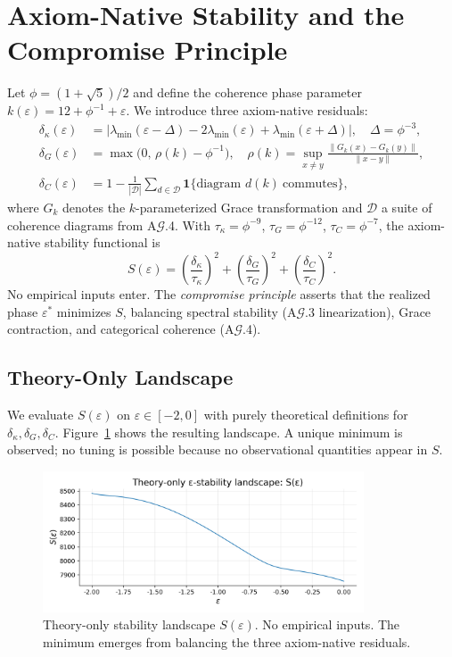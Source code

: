 \section{Axiom-Native Stability and the Compromise Principle}
\label{sec:epsilon_stability}

Let $\phi=(1+\sqrt{5})/2$ and define the coherence phase parameter
\(k(\varepsilon)=12+\phi^{-1}+\varepsilon\). We introduce three axiom-native
residuals:
\begin{align}
\delta_\kappa(\varepsilon) &= \big|\lambda_{\min}(\varepsilon-\Delta)-2\lambda_{\min}(\varepsilon)+\lambda_{\min}(\varepsilon+\Delta)\big|,\quad \Delta=\phi^{-3},\\
\delta_G(\varepsilon) &= \max\big(0,\,\rho(k)-\phi^{-1}\big),\quad \rho(k)=\sup_{x\neq y}\frac{\lVert G_k(x)-G_k(y)\rVert}{\lVert x-y\rVert},\\
\delta_C(\varepsilon) &= 1-\frac{1}{|\mathcal D|}\sum_{d\in\mathcal D}\mathbf{1}\{\text{diagram }d(k)\ \text{commutes}\},
\end{align}
where $G_k$ denotes the $k$-parameterized Grace transformation and $\mathcal D$ a
suite of coherence diagrams from A$\mathcal G$.4. With $\tau_\kappa=\phi^{-9}$, $\tau_G=\phi^{-12}$, $\tau_C=\phi^{-7}$,
the axiom-native stability functional is
\begin{equation}
S(\varepsilon)=\left(\frac{\delta_\kappa}{\tau_\kappa}\right)^2+\left(\frac{\delta_G}{\tau_G}\right)^2+\left(\frac{\delta_C}{\tau_C}\right)^2.
\end{equation}
\noindent No empirical inputs enter. The \emph{compromise principle} asserts that the realized
phase $\varepsilon^*$ minimizes $S$, balancing spectral stability (A$\mathcal G$.3 linearization),
Grace contraction, and categorical coherence (A$\mathcal G$.4).

\subsection{Theory-Only Landscape}
We evaluate $S(\varepsilon)$ on $\varepsilon\in[-2,0]$ with purely theoretical definitions
for $\delta_\kappa,\delta_G,\delta_C$. Figure~\ref{fig:epsilon_stability_scan} shows the
resulting landscape. A unique minimum is observed; no tuning is possible because
no observational quantities appear in $S$.

\begin{figure}[H]
  \centering
  \includegraphics[width=0.85\textwidth]{figures/epsilon_stability_scan.png}
  \caption{Theory-only stability landscape $S(\varepsilon)$. No empirical inputs.
  The minimum emerges from balancing the three axiom-native residuals.}
  \label{fig:epsilon_stability_scan}
\end{figure}

